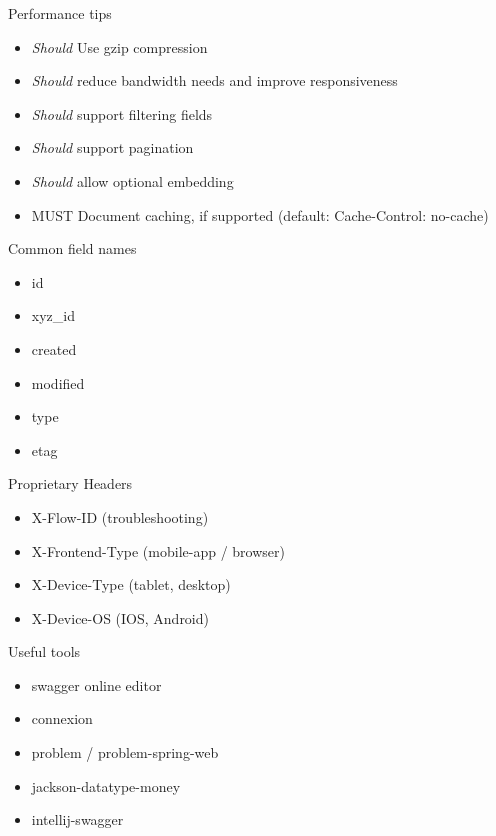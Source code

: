 \documentclass[10pt]{beamer}
\begin{document}
\begin{frame}{Performance tips}
  \begin{itemize}
    \item \emph{Should} Use gzip compression
    \item \emph{Should} reduce bandwidth needs and improve responsiveness
    \item \emph{Should} support filtering fields
    \item \emph{Should} support pagination
    \item \emph{Should} allow optional embedding
    \item MUST Document caching, if supported (default: Cache-Control: no-cache)
  \end{itemize}
\end{frame}

\begin{frame}{Common field names}
  \begin{itemize}
    \item id
    \item xyz\_id
    \item created
    \item modified
    \item type
    \item etag
  \end{itemize}

\end{frame}

\begin{frame}{Proprietary Headers}
  \begin{itemize}
    \item X-Flow-ID (troubleshooting)
    \item X-Frontend-Type (mobile-app / browser)
    \item X-Device-Type (tablet, desktop)
    \item X-Device-OS (IOS, Android)
  \end{itemize}
\end{frame}

\begin{frame}{Useful tools}
  \begin{itemize}
    \item swagger online editor
    \item connexion
    \item problem / problem-spring-web
    \item jackson-datatype-money
    \item intellij-swagger
  \end{itemize}
\end{frame}
\end{document}
